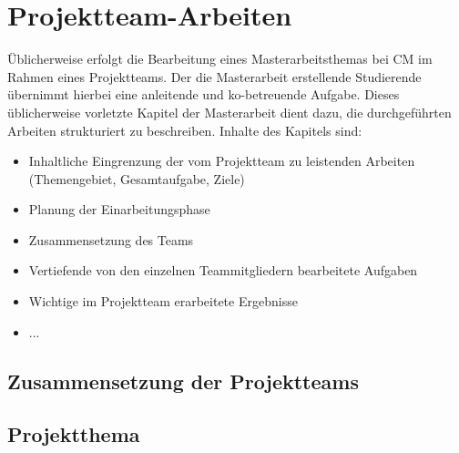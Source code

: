 \chapter{Projektteam-Arbeiten}
Üblicherweise erfolgt die Bearbeitung eines Masterarbeitsthemas bei \gls{CM} im Rahmen eines Projektteams. Der die Masterarbeit erstellende Studierende übernimmt hierbei eine anleitende und ko-betreuende Aufgabe. Dieses üblicherweise vorletzte Kapitel der Masterarbeit dient dazu, die durchgeführten Arbeiten strukturiert zu beschreiben. Inhalte des Kapitels sind:

\begin{itemize}
	\item Inhaltliche Eingrenzung der vom Projektteam zu leistenden Arbeiten (Themengebiet, Gesamtaufgabe, Ziele)
	\item Planung der Einarbeitungsphase
	\item Zusammensetzung des Teams
	\item Vertiefende von den einzelnen Teammitgliedern bearbeitete Aufgaben
	\item Wichtige im Projektteam erarbeitete Ergebnisse
	\item ...
\end{itemize}

\section{Zusammensetzung der Projektteams}

\section{Projektthema}